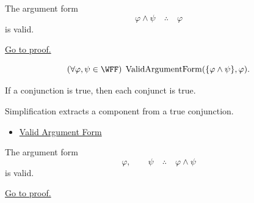 \begin{tcolorbox}[colback=thmbox, colframe=thmborder, arc=2pt,
  left=6pt, right=6pt, top=4pt, bottom=4pt,
  title={\small\textbf{Theorem (Simplification is Valid)}},
  fonttitle=\small\bfseries]
\begin{theorem}
\label{thm:simplification-validity-propositional-logic}
The argument form
\[
\varphi\land\psi \quad\therefore\quad \varphi
\]
is valid.

\noindent\hyperref[prf:simplification-validity-propositional-logic]{Go to proof.}
\end{theorem}
\end{tcolorbox}

\begin{remark*}
\[
(\forall\varphi,\psi\in\WFF)\;\operatorname{ValidArgumentForm}(\{\varphi\land\psi\},\varphi).
\]
\end{remark*}

\begin{remark*}
If a conjunction is true, then each conjunct is true.
\end{remark*}

\begin{remark*}[Interpretation]
Simplification extracts a component from a true conjunction.
\end{remark*}

\begin{dependencies}
\begin{itemize}
  \item \hyperref[def:valid-argument-form-propositional-logic]{Valid Argument Form}
\end{itemize}
\end{dependencies}

\begin{tcolorbox}[colback=thmbox, colframe=thmborder, arc=2pt,
  left=6pt, right=6pt, top=4pt, bottom=4pt,
  title={\small\textbf{Theorem (Conjunction Introduction is Valid)}},
  fonttitle=\small\bfseries]
\begin{theorem}
\label{thm:conjunction-introduction-validity-propositional-logic}
The argument form
\[
\varphi,\qquad \psi \quad\therefore\quad \varphi\land\psi
\]
is valid.

\noindent\hyperref[prf:conjunction-introduction-validity-propositional-logic]{Go to proof.}
\end{theorem}
\end{tcolorbox}

